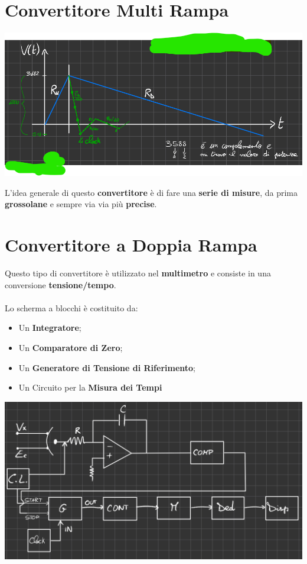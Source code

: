 \section{Convertitore Multi Rampa}
\begin{center}
    \includegraphics[width=.8\textwidth]{Images/figure46.png}
\end{center}
L'idea generale di questo \textbf{convertitore} è di fare una \textbf{serie di misure}, da prima \textbf{grossolane} e sempre via via più \textbf{precise}.

\section{Convertitore a Doppia Rampa}
Questo tipo di convertitore è utilizzato nel \textbf{multimetro} e consiste in una conversione \textbf{tensione/tempo}.\\ \\
Lo scherma a blocchi è costituito da:
\begin{itemize}
    \item Un \textbf{Integratore};
    \item Un \textbf{Comparatore di Zero};
    \item Un \textbf{Generatore di Tensione di Riferimento};
    \item Un Circuito per la \textbf{Misura dei Tempi}
\end{itemize}
\begin{center}
    \includegraphics[width=\textwidth]{Images/figure27.png}
\end{center}

